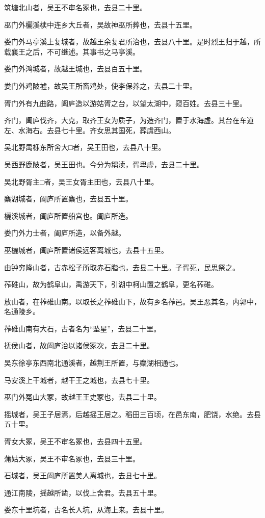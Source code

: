 \documentclass[12pt,UTF8]{ctexbook}
\begin{document}
筑塘北山者，吴王不审名冢也，去县二十里。

巫门外欐溪椟中连乡大丘者，吴故神巫所葬也，去县十五里。

娄门外马亭溪上复城者，故越王余复君所治也，去县八十里。是时烈王归于越，所载襄王之后，不可继述。其事书之马亭溪。

娄门外鸿城者，故越王城也，去县百五十里。

娄门外鸡陂墟，故吴王所畜鸡处，使李保养之，去县二十里。

胥门外有九曲路，阖庐造以游姑胥之台，以望太湖中，窥百姓。去县三十里。

齐门，阖庐伐齐，大克，取齐王女为质子，为造齐门，置于水海虚。其台在车道左、水海右。去县七十里。齐女思其国死，葬虞西山。

吴北野禺栎东所舍大□者，吴王田也，去县八十里。

吴西野鹿陂者，吴王田也。今分为耦渎，胥卑虚，去县二十里。

吴北野胥主□者，吴王女胥主田也，去县八十里。

麋湖城者，阖庐所置麋也，去县五十里。

欐溪城者，阖庐所置船宫也。阖庐所造。

娄门外力士者，阖庐所造，以备外越。

巫欐城者，阖庐所置诸侯远客离城也，去县十五里。

由钟穷隆山者，古赤松子所取赤石脂也，去县二十里。子胥死，民思祭之。

莋碓山，故为鹤阜山，禹游天下，引湖中柯山置之鹤阜，更名莋碓。

放山者，在莋碓山南。以取长之莋碓山下，故有乡名莋邑。吴王恶其名，内郭中，名通陵乡。

莋碓山南有大石，古者名为“坠星”，去县二十里。

抚侯山者，故阖庐治以诸侯冢次，去县二十里。

吴东徐亭东西南北通溪者，越荆王所置，与麋湖相通也。

马安溪上干城者，越干王之城也，去县七十里。

巫门外冤山大冢，故越王王史冢也，去县二十里。

摇城者，吴王子居焉，后越摇王居之。稻田三百顷，在邑东南，肥饶，水绝。去县五十里。

胥女大冢，吴王不审名冢也，去县四十五里。

蒲姑大冢，吴王不审名冢也，去县三十里。

石城者，吴王阖庐所置美人离城也，去县七十里。

通江南陵，摇越所凿，以伐上舍君。去县五十里。

娄东十里坑者，古名长人坑，从海上来。去县十里。
\end{document}
